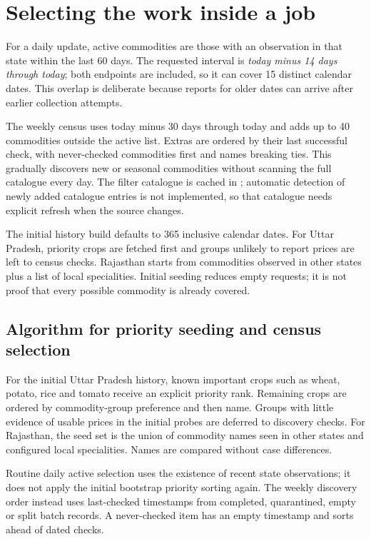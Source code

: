 \documentclass[12pt,a4paper,oneside]{report}
\numberwithin{equation}{chapter}
\numberwithin{figure}{chapter}
\numberwithin{table}{chapter}
\theoremstyle{definition}
\begin{document}
\section{Selecting the work inside a job}
For a daily update, active commodities are those with an observation in that state within the last 60 days. The requested interval is \emph{today minus 14 days through today}; both endpoints are included, so it can cover 15 distinct calendar dates. This overlap is deliberate because reports for older dates can arrive after earlier collection attempts.

The weekly census uses today minus 30 days through today and adds up to 40 commodities outside the active list. Extras are ordered by their last successful check, with never-checked commodities first and names breaking ties. This gradually discovers new or seasonal commodities without scanning the full catalogue every day. The filter catalogue is cached in ; automatic detection of newly added catalogue entries is not implemented, so that catalogue needs explicit refresh when the source changes.

The initial history build defaults to 365 inclusive calendar dates. For Uttar Pradesh, priority crops are fetched first and groups unlikely to report prices are left to census checks. Rajasthan starts from commodities observed in other states plus a list of local specialities. Initial seeding reduces empty requests; it is not proof that every possible commodity is already covered.

\subsection{Algorithm for priority seeding and census selection}
For the initial Uttar Pradesh history, known important crops such as wheat, potato, rice and tomato receive an explicit priority rank. Remaining crops are ordered by commodity-group preference and then name. Groups with little evidence of usable prices in the initial probes are deferred to discovery checks. For Rajasthan, the seed set is the union of commodity names seen in other states and configured local specialities. Names are compared without case differences.

Routine daily active selection uses the existence of recent state observations; it does not apply the initial bootstrap priority sorting again. The weekly discovery order instead uses last-checked timestamps from completed, quarantined, empty or split batch records. A never-checked item has an empty timestamp and sorts ahead of dated checks.
\end{document}

